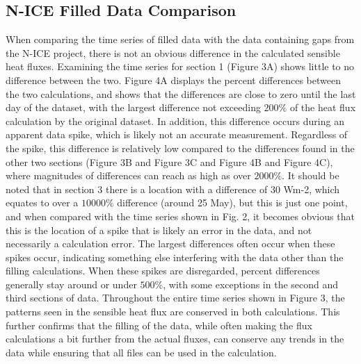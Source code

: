 

\subsection{N-ICE Filled Data Comparison}

When comparing the time series of filled data with the data containing gaps from the N-ICE project, there is not an obvious difference in the calculated sensible heat fluxes. Examining the time series for section 1 (Figure 3A) shows little to no difference between the two. Figure 4A displays the percent differences between the two calculations, and shows that the differences are close to zero until the last day of the dataset, with the largest difference not exceeding $200\%$ of the heat flux calculation by the original dataset. In addition, this difference occurs during an apparent data spike, which is likely not an accurate measurement. Regardless of the spike, this difference is relatively low compared to the differences found in the other two sections (Figure 3B and Figure 3C and Figure 4B and Figure 4C), where magnitudes of differences can reach as high as over $2000\%$. It should be noted that in section 3 there is a location with a difference of 30 Wm-2, which equates to over a $10000\%$ difference (around 25 May), but this is just one point, and when compared with the time series shown in Fig. 2, it becomes obvious that this is the location of a spike that is likely an error in the data, and not necessarily a calculation error. The largest differences often occur when these spikes occur, indicating something else interfering with the data other than the filling calculations. When these spikes are disregarded, percent differences generally stay around or under $500\%$, with some exceptions in the second and third sections of data. Throughout the entire time series shown in Figure 3, the patterns seen in the sensible heat flux are conserved in both calculations. This further confirms that the filling of the data, while often making the flux calculations a bit further from the actual fluxes, can conserve any trends in the data while ensuring that all files can be used in the calculation. 


